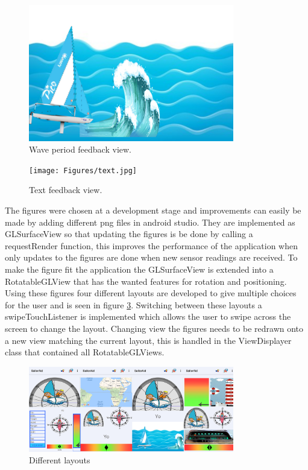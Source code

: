 \begin{figure}[H]
\centering
\includegraphics[width=0.8\textwidth]{Figures/wave.png}
\caption{Wave period feedback view.}
\label{feedback-wave}
\end{figure}
\begin{figure}[H]
\centering
\texttt{[image: Figures/text.jpg]}
\caption{Text feedback view.}
\label{feedback-text}
\end{figure}
The figures were chosen at a development stage and improvements can easily be made by adding different \gls{png}\cite{png} files in android studio. They are implemented as GLSurfaceView\cite{gl} so that updating the figures is be done by calling a requestRender function, this improves the performance of the application when only updates to the figures are done when new sensor readings are received. To make the figure fit the application the GLSurfaceView is extended into a RotatableGLView that has the wanted features for rotation and positioning. Using these figures four different layouts are developed to give multiple choices for the user and is seen in figure \ref{feedback-layouts}. Switching between these layouts a swipeTouchListener is implemented which allows the user to swipe across the screen to change the layout. Changing view the figures needs to be redrawn onto a new view matching the current layout, this is handled in the ViewDisplayer class that contained all RotatableGLViews.

\begin{figure}[H]
\centering
\includegraphics[width=0.8\textwidth]{Figures/layouts.png}
\caption{Different layouts}
\label{feedback-layouts}
\end{figure}

